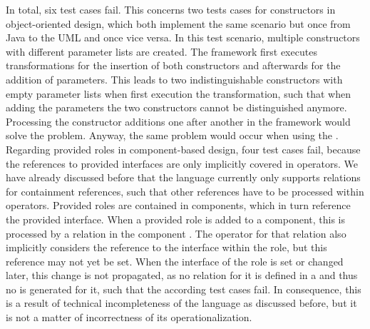 In total, six test cases fail.
This concerns two tests cases for constructors in object-oriented design, which both implement the same scenario but once from Java to the \gls{UML} and once vice versa.
In this test scenario, multiple constructors with different parameter lists are created.
The \vitruv framework first executes transformations for the insertion of both constructors and afterwards for the addition of parameters.
This leads to two indistinguishable constructors with empty parameter lists when first execution the transformation, such that when adding the parameters the two constructors cannot be distinguished anymore.
Processing the constructor additions one after another in the framework would solve the problem.
Anyway, the same problem would occur when using the \reactionslanguage.
Regarding provided roles in component-based design, four test cases fail, because the references to provided interfaces are only implicitly covered in operators.
We have already discussed before that the \commonalities language currently only supports relations for containment references, such that other references have to be processed within operators.
Provided roles are contained in components, which in turn reference the provided interface.
When a provided role is added to a component, this is processed by a relation in the component \commonality.
The operator for that relation also implicitly considers the reference to the interface within the role, but this reference may not yet be set.
When the interface of the role is set or changed later, this change is not propagated, as no relation for it is defined in a \commonality and thus no \reaction is generated for it, such that the according test cases fail.
In consequence, this is a result of technical incompleteness of the \commonalities language as discussed before, but it is not a matter of incorrectness of its operationalization.




